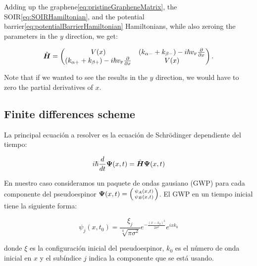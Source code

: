     Adding up the graphene\eqref{eq:pristineGrapheneMatrix}, the SOIR\eqref{eq:SOIRHamiltonian}, and the potential barrier\eqref{eq:potentialBarrierHamiltonian} Hamiltonians, while also zeroing the parameters in the $y$ direction, we get:

    \begin{equation}
        \label{eq:hybridHamiltonian}
        \hat{\mbox{\boldmath $H$}}=
        \begin{pmatrix}
            V(x) & \left(k_{\alpha-}+k_{\beta-}\right)-i\hbar v_{\mbox{\tiny F}}\frac{\partial}{\partial x}\\
            \left(k_{\alpha+}+k_{\beta+}\right)-i\hbar v_{\mbox{\tiny F}}\frac{\partial}{\partial x} & V(x)
        \end{pmatrix}.
    \end{equation}

    Note that if we wanted to see the results in the $y$ direction, we would have to zero the partial derivatives of $x$.

    \subsection{Finite differences scheme}\label{subsec:finite-differences-scheme}

    La principal ecuación a resolver es la ecuación de Schrödinger dependiente del tiempo:

    \begin{equation}
        \label{eq:schrodingerTimeDependent}
        i\hbar \frac{d}{dt}\mbox{\boldmath $\Psi$}(x,t) = \hat{\mbox{\boldmath $H$}}\mbox{\boldmath $\Psi$}(x,t)
    \end{equation}

    En nuestro caso consideramos un paquete de ondas gausiano (GWP) para cada componente del pseudoespinor $\bn{\Psi}(x,t)=\begin{psmallmatrix*}\psi_A(x,t)\\\psi_B(x,t)\end{psmallmatrix*}$.
    El GWP en un tiempo inicial tiene la siguiente forma:

    \begin{equation}
        \label{eq:GWP}
        \psi_j(x,t_0)=\frac{\xi_j}{\sqrt[4]{\pi\sigma^2}}e^{-\frac{(x-x_0)^2}{2\sigma^2}}e^{ixk_0}
    \end{equation}

    \noindent donde $\xi$ es la configuración inicial del pseudoespinor, $k_0$ es el número de onda inicial en $x$ y el subíndice $j$ indica la componente que se está usando.

